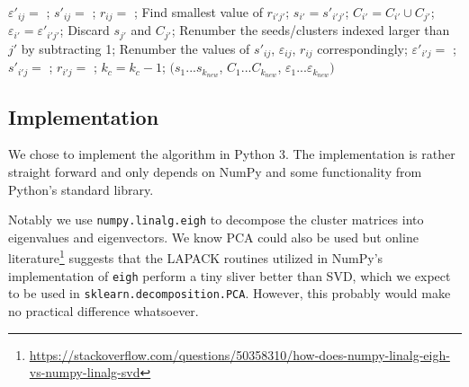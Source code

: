 \documentclass[english]{scrartcl}
\begin{document}
\begin{algorithm}
\begin{algorithmic}
        \State $\varepsilon'_{ij} =$ ;
        \State $s'_{ij} =$ ;
        \State $r_{ij} =$ ;
    \EndFor
            Find smallest value of $r_{i'j'}$;
        \EndFor
        \State $s_{i'} = s'_{i'j'}$; $C_{i'} = C_{i'} \cup C_{j'}$; $\varepsilon_{i'} = \varepsilon'_{i'j'}$;
        \State Discard $s_{j'}$ and $C_{j'}$;
        \State Renumber the seeds/clusters indexed larger than $j'$ by subtracting 1;
            Renumber the values of $s'_{ij}$, $\varepsilon_{ij}$, $r_{ij}$ correspondingly;
        \EndFor
            \State $\varepsilon'_{i'j} =$ ;
            \State $s'_{i'j} =$ ;
            \State $r_{i'j} =$ ;
        \EndFor
        $k_c = k_c - 1$;
    \EndWhile
    \Return $(s_1...s_{k_{new}}$, $C_1...C_{k_{new}}$, $\varepsilon_1...\varepsilon_{k_{new}})$
\EndFunction
\end{algorithmic}
\end{algorithm}

\subsection{Implementation}

We chose to implement the algorithm in Python 3. The implementation is rather straight
forward and only depends on NumPy and some functionality from Python's standard
library.

Notably we use \texttt{numpy.linalg.eigh} to decompose the cluster matrices
into eigenvalues and eigenvectors. We know PCA could also be used but online
literature\footnote{\url{https://stackoverflow.com/questions/50358310/how-does-numpy-linalg-eigh-vs-numpy-linalg-svd}}
suggests that the LAPACK routines utilized in NumPy's implementation of
\texttt{eigh} perform a tiny sliver better than SVD, which we expect to be used
in \texttt{sklearn.decomposition.PCA}.  However, this probably would make no
practical difference whatsoever.
\end{document}
